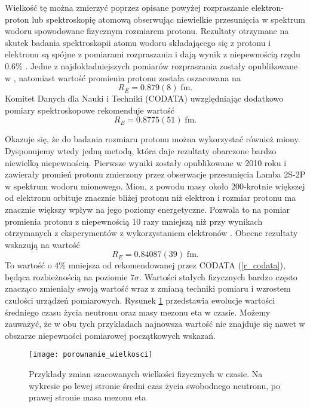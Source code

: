 \documentclass[11pt]{book}
\theoremstyle{definition}
\begin{document}
Wielkość tę można zmierzyć poprzez opisane powyżej rozpraszanie elektron-proton lub spektroskopię atomową obserwując niewielkie przesunięcia w spektrum wodoru spowodowane fizycznym rozmiarem protonu. Rezultaty otrzymane na skutek badania spektroskopii atomu wodoru składającego się z protonu i elektronu są spójne z pomiarami rozpraszania i dają wynik z niepewnością rzędu 0.6\% \cite{Carlson:2015jba}. Jedne z najdokładniejszych pomiarów rozpraszania zostały opublikowane w \cite{Bernauer:2010wm}, natomiast wartość promienia protonu została oszacowana na
%
\begin{equation}
R_E = 0.879(8) \; \text{fm}.
\end{equation}
%
Komitet Danych dla Nauki i Techniki (CODATA) uwzględniając dodatkowo pomiary spektroskopowe rekomenduje wartość \cite{2012RvMP...84.1527M}
%
\begin{equation}
R_E = 0.8775(51) \; \text{fm}. \label{r_codata}
\end{equation}

Okazuje się, że do badania rozmiaru protonu można wykorzystać również miony. Dysponujemy wtedy jedną metodą, która daje rezultaty obarczone bardzo niewielką niepewnością. Pierwsze wyniki zostały opublikowane w 2010 roku \cite{2010Nature..Pohl} i zawierały promień protonu zmierzony przez obserwacje przesunięcia Lamba 2S-2P w spektrum wodoru mionowego. Mion, z powodu masy około 200-krotnie większej od elektronu orbituje znacznie bliżej protonu niż elektron i rozmiar protonu ma znacznie większy wpływ na jego poziomy energetyczne. Pozwala to na pomiar promienia protonu z niepewnością 10 razy mniejszą niż przy wynikach otrzymanych z eksperymentów z wykorzystaniem elektronów \cite{Carlson:2015jba}.  Obecne rezultaty wskazują na wartość \cite{Antognini417}
%
\begin{equation}
R_E = 0.84087(39) \; \text{fm}.
\end{equation}
%
To wartość o 4\% mniejsza od rekomendowanej przez CODATA (\ref{r_codata}), będąca rozbieżnością na poziomie $7\sigma$. Wartości stałych fizycznych bardzo często znacząco zmieniały swoją wartość wraz z zmianą techniki pomiaru i wzrostem czułości urządzeń pomiarowych. Rysunek \ref{fig:porownaniewielkosci} przedstawia ewolucje wartości średniego czasu życia neutronu oraz masy mezonu eta w czasie. Możemy zauważyć, że w obu tych przykładach najnowsza wartość nie znajduje się nawet w obszarze niepewności pomiarowej początkowych wskazań.


\begin{figure}[h!]
	\centering
		\texttt{[image: porownanie\_wielkosci]}
	\caption{Przykłady zmian szacowanych wielkości fizycznych w czasie. Na wykresie po lewej stronie średni czas życia swobodnego neutronu, po prawej stronie masa mezonu eta \cite{PhysRevD.86.010001}}
	\label{fig:porownaniewielkosci}
\end{figure}
\end{document}
